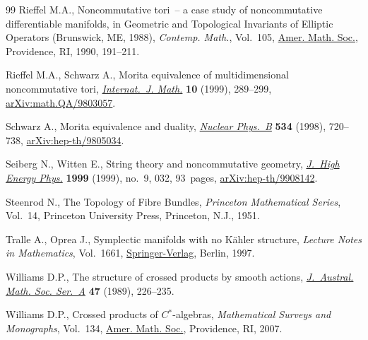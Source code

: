 \begin{thebibliography}{99}
Rieffel M.A., Noncommutative tori~-- a case study of noncommutative
 differentiable manifolds, in Geometric and Topological Invariants of Elliptic
 Operators ({B}runswick, {ME}, 1988), \textit{Contemp. Math.}, Vol.~105, \href{https://doi.org/10.1090/conm/105/1047281}{Amer.
 Math. Soc.}, Providence, RI, 1990, 191--211.

Rieffel M.A., Schwarz A., Morita equivalence of multidimensional noncommutative
 tori, \href{https://doi.org/10.1142/S0129167X99000100}{\textit{Internat.~J. Math.}} \textbf{10} (1999), 289--299,
 \href{https://arxiv.org/abs/math.QA/9803057}{arXiv:math.QA/9803057}.

Schwarz A., Morita equivalence and duality, \href{https://doi.org/10.1016/S0550-3213(98)00550-1}{\textit{Nuclear Phys.~B}}
 \textbf{534} (1998), 720--738, \href{https://arxiv.org/abs/hep-th/9805034}{arXiv:hep-th/9805034}.

Seiberg N., Witten E., String theory and noncommutative geometry,
 \href{https://doi.org/10.1088/1126-6708/1999/09/032}{\textit{J.~High Energy Phys.}} \textbf{1999} (1999), no.~9, 032, 93~pages,
 \href{https://arxiv.org/abs/hep-th/9908142}{arXiv:hep-th/9908142}.

Steenrod N., The {T}opology of {F}ibre {B}undles, \textit{Princeton Mathematical
 Series}, Vol.~14, Princeton University Press, Princeton, N.J., 1951.

Tralle A., Oprea J., Symplectic manifolds with no {K}\"ahler structure,
 \textit{Lecture Notes in Mathematics}, Vol.~1661, \href{https://doi.org/10.1007/BFb0092608}{Springer-Verlag}, Berlin,
 1997.

Williams D.P., The structure of crossed products by smooth actions,
 \href{https://doi.org/10.1017/S1446788700031657}{\textit{J.~Austral. Math. Soc. Ser.~A}} \textbf{47} (1989), 226--235.

Williams D.P., Crossed products of {$C{^\ast}$}-algebras, \textit{Mathematical
 Surveys and Monographs}, Vol.~134, \href{https://doi.org/10.1090/surv/134}{Amer. Math. Soc.}, Providence, RI, 2007.

\end{thebibliography}
